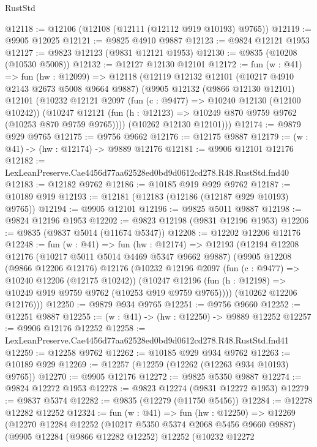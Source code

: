 \begin{lexlean}{RustStd}
\begin{coremodule}
@12118 := @12106 (@12108 (@12111 (@12112 @919 @10193) @9765))
@12119 := @9905 @12025
@12121 := @9825 @4910 @9887
@12123 := @9824 @12121 @1953
@12127 := @9823 @12123 (@9831 @12121 @1953)
@12130 := @9835 (@10208 (@10530 @5008))
@12132 := @12127 @12130 @12101
@12172 := fun (w : @41) =>
  fun (hw : @12099) =>
  @12118
    (@12119
      @12132
      @12101
      (@10217 @4910 @2143 @2673 @5008 @9664 @9887)
      (@9905
        @12132
        (@9866 @12130 @12101)
        @12101
        (@10232
          @12121
          @2097
          (fun (c : @9477) => @10240 @12130 (@12100 @10242))
          (@10247 @12121 (fun (h : @12123) => @10249 @870 @9759 @9762 (@10253 @870 @9759 @9765))))
        (@10262 @12130 @12101)))
@12174 := @9879 @929 @9765
@12175 := @9756 @9662
@12176 := @12175 @9887
@12179 := (w : @41) -> (hw : @12174) -> @9889 @12176
@12181 := @9906 @12101 @12176
@12182 := LexLeanPreserve.Cae4456d77aa62528ed0bd9d0612cd278.R48.RustStd.fnd40
@12183 := @12182 @9762
@12186 := @10185 @919 @929 @9762
@12187 := @10189 @919
@12193 := @12181 (@12183 (@12186 (@12187 @929 @10193) @9765))
@12194 := @9905 @12101
@12196 := @9825 @5011 @9887
@12198 := @9824 @12196 @1953
@12202 := @9823 @12198 (@9831 @12196 @1953)
@12206 := @9835 (@9837 @5014 (@11674 @5347))
@12208 := @12202 @12206 @12176
@12248 := fun (w : @41) =>
  fun (hw : @12174) =>
  @12193
    (@12194
      @12208
      @12176
      (@10217 @5011 @5014 @4469 @5347 @9662 @9887)
      (@9905
        @12208
        (@9866 @12206 @12176)
        @12176
        (@10232
          @12196
          @2097
          (fun (c : @9477) => @10240 @12206 (@12175 @10242))
          (@10247 @12196 (fun (h : @12198) => @10249 @919 @9759 @9762 (@10253 @919 @9759 @9765))))
        (@10262 @12206 @12176)))
@12250 := @9879 @934 @9765
@12251 := @9756 @9660
@12252 := @12251 @9887
@12255 := (w : @41) -> (hw : @12250) -> @9889 @12252
@12257 := @9906 @12176 @12252
@12258 := LexLeanPreserve.Cae4456d77aa62528ed0bd9d0612cd278.R48.RustStd.fnd41
@12259 := @12258 @9762
@12262 := @10185 @929 @934 @9762
@12263 := @10189 @929
@12269 := @12257 (@12259 (@12262 (@12263 @934 @10193) @9765))
@12270 := @9905 @12176
@12272 := @9825 @5350 @9887
@12274 := @9824 @12272 @1953
@12278 := @9823 @12274 (@9831 @12272 @1953)
@12279 := @9837 @5374
@12282 := @9835 (@12279 (@11750 @5456))
@12284 := @12278 @12282 @12252
@12324 := fun (w : @41) =>
  fun (hw : @12250) =>
  @12269
    (@12270
      @12284
      @12252
      (@10217 @5350 @5374 @2068 @5456 @9660 @9887)
      (@9905
        @12284
        (@9866 @12282 @12252)
        @12252
        (@10232
          @12272

\end{coremodule}
\end{lexlean}
